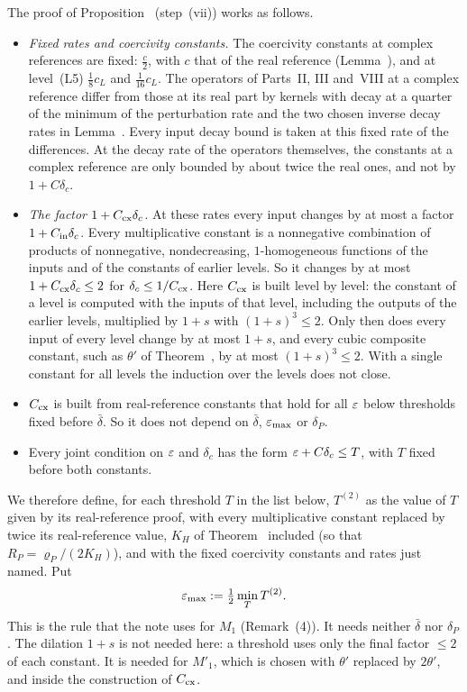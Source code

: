 \begin{detail}
\begin{step}
The proof of Proposition~ (step~(vii)) works as follows.
\begin{itemize}
\item \emph{Fixed rates and coercivity constants.} The coercivity constants at complex references are fixed: $\frac c2$, with $c$ that of the real reference (Lemma~), and at level~(L5) $\frac18c_L$ and $\frac1{16}c_L$. The operators of Parts~II, III and~VIII at a complex reference differ from those at its real part by kernels with decay at a quarter of the minimum of the perturbation rate and the two chosen inverse decay rates in Lemma~. Every input decay bound is taken at this fixed rate of the differences. At the decay rate of the operators themselves, the constants at a complex reference are only bounded by about twice the real ones, and not by $1+C\delta_c$.
\item \emph{The factor $1+C_{\rm cx}\delta_c$.} At these rates every input changes by at most a factor $1+C_{\rm in}\delta_c$. Every multiplicative constant is a nonnegative combination of products of nonnegative, nondecreasing, $1$-homogeneous functions of the inputs and of the constants of earlier levels. So it changes by at most $1+C_{\rm cx}\delta_c\le2$ for $\delta_c\le1/C_{\rm cx}$. Here $C_{\rm cx}$ is built level by level: the constant of a level is computed with the inputs of that level, including the outputs of the earlier levels, multiplied by $1+s$ with $(1+s)^3\le2$. Only then does every input of every level change by at most $1+s$, and every cubic composite constant, such as $\theta'$ of Theorem~, by at most $(1+s)^3\le2$. With a single constant for all levels the induction over the levels does not close.
\item $C_{\rm cx}$ is built from real-reference constants that hold for all $\varepsilon$ below thresholds fixed before $\bar\delta$. So it does not depend on $\bar\delta$, $\varepsilon_{\max}$ or $\delta_P$.
\item Every joint condition on $\varepsilon$ and $\delta_c$ has the form $\varepsilon+C\delta_c\le T$, with $T$ fixed before both constants.
\end{itemize}
We therefore define, for each threshold $T$ in the list below, $T^{(2)}$ as the value of $T$ given by its real-reference proof, with every multiplicative constant replaced by twice its real-reference value, $K_H$ of Theorem~ included (so that $R_P=\varrho_P/(2K_H)$), and with the fixed coercivity constants and rates just named. Put
\[
\varepsilon_{\max}:=\tfrac12\min_TT^{(2)} .
\]
This is the rule that the note uses for $M_1$ (Remark~(4)). It needs neither $\bar\delta$ nor $\delta_P$. The dilation $1+s$ is not needed here: a threshold uses only the final factor $\le2$ of each constant. It is needed for $M'_1$, which is chosen with $\theta'$ replaced by $2\theta'$, and inside the construction of $C_{\rm cx}$.
\end{step}


\end{detail}
